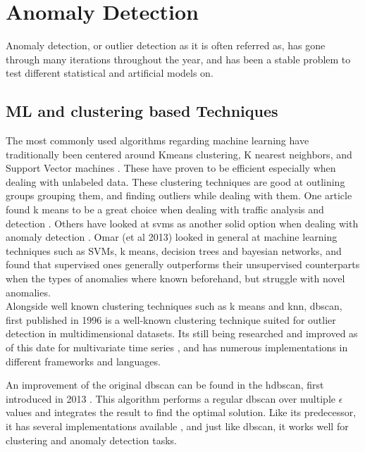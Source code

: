 \section{Anomaly Detection}
\label{relwork:anomaly}

Anomaly detection, or outlier detection as it is often referred as, has gone through many iterations throughout the year, and has been a stable problem to test different statistical and artificial models on. \\ 


\subsection{ML and clustering based Techniques}

The most commonly used algorithms regarding machine learning have traditionally been centered around Kmeans clustering, K nearest neighbors, and  Support Vector machines \cite{10.14778/3538598.3538602, 10.1145/3444690}. These have proven to be efficient especially when dealing with unlabeled data. These clustering techniques are good at outlining groups grouping them, and finding outliers while dealing with them. One article found k means to be a great choice when dealing with traffic analysis and detection \cite{7507933}. Others have looked at svms as another solid option when dealing with anomaly detection \cite{10.1007/978-3-540-28647-9_97}. Omar (et al 2013) \cite{omar2013machine} looked in general at machine learning techniques such as SVMs, k means, decision trees and bayesian networks, and found that supervised ones generally outperforms their unsupervised counterparts when the types of anomalies where known beforehand, but struggle with novel anomalies. \\ 

Alongside well known clustering techniques such as k means and knn, \acrfull{dbscan}, first published in 1996 \cite{10.5555/3001460.3001507} is a well-known clustering technique suited for outlier detection in multidimensional datasets. Its still being researched and improved as of this date for multivariate time series \cite{waltz2024time}, and has numerous implementations in different frameworks and languages. 

An improvement of the original \acrshort{dbscan} can be found in the \acrfull{hdbscan}, first introduced in 2013 \cite{10.1007/978-3-642-37456-2_14}. This algorithm performs a regular dbscan over multiple $\epsilon$ values and integrates the result to find the optimal solution. Like its predecessor, it has several implementations available \cite{McInnes2017}, and just like dbscan, it works well for clustering and anomaly detection tasks. \\




